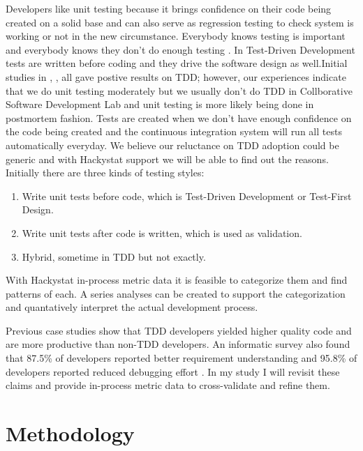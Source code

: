 \documentclass[11pt,twocolumn]{article}
\begin{document}
Developers like unit testing because it brings confidence \cite{Hunt:03} on
their code being created on a solid base and can also serve as regression
testing to check system is working or not in the new circumstance.
Everybody knows testing is important and everybody knows they don't do
enough testing \cite{Beck:00}.  In Test-Driven Development tests are
written before coding and they drive the software design as well.Initial
studies in \cite{Edwards:04}, \cite{George:2003}, \cite{Maximilien:2003}
all gave postive results on TDD; however, our experiences indicate that we
do unit testing moderately but we usually don't do TDD in Collborative
Software Development Lab and unit testing is more likely being done in
postmortem fashion. Tests are created when we don't have enough confidence
on the code being created and the continuous integration system will run
all tests automatically everyday. We believe our reluctance on TDD adoption
could be generic and with Hackystat support we will be able to find out the
reasons. Initially there are three kinds of testing styles:

\begin{enumerate}
\item Write unit tests before code, which is Test-Driven Development or
Test-First Design.
\item Write unit tests after code is written, which is used as validation. 
\item Hybrid, sometime in TDD but not exactly.
\end{enumerate}

With Hackystat in-process metric data it is feasible to categorize them and
find patterns of each. A series analyses can be created to support the
categorization and quantatively interpret the actual development process.

Previous case studies show that TDD developers yielded higher quality code
and are more productive than non-TDD developers.  An informatic survey also
found that 87.5\% of developers reported better requirement understanding
and 95.8\% of developers reported reduced debugging effort
\cite{HawleyBlog}. In my study I will revisit these claims and provide
in-process metric data to cross-validate and refine them.

\section{Methodology}
\label{sec:method}
\end{document}
